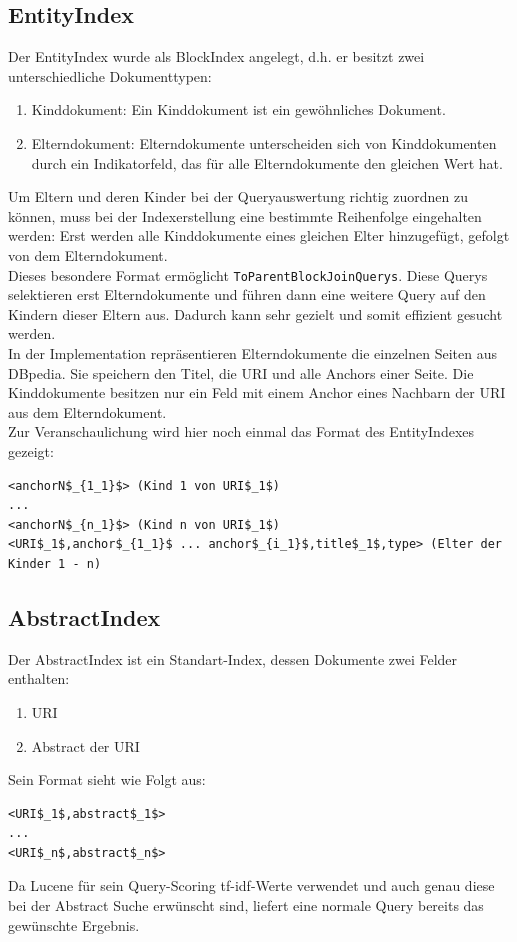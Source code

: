 \documentclass[11pt, a4paper, oneside]{Thesis} %
\begin{document}
\subsection{EntityIndex}
Der EntityIndex wurde als BlockIndex angelegt, d.h. er besitzt zwei unterschiedliche Dokumenttypen:
\begin{enumerate}
\item Kinddokument: Ein Kinddokument ist ein gew\"ohnliches Dokument.
\item Elterndokument: Elterndokumente unterscheiden sich von Kinddokumenten durch ein Indikatorfeld, das f\"ur alle Elterndokumente den gleichen Wert hat.
\end{enumerate}
Um Eltern und deren Kinder bei der Queryauswertung richtig zuordnen zu k\"onnen, muss bei der Indexerstellung eine bestimmte Reihenfolge eingehalten werden: Erst werden alle Kinddokumente eines gleichen Elter hinzugef\"ugt, gefolgt von dem Elterndokument.\\
Dieses besondere Format erm\"oglicht \texttt{ToParentBlockJoinQuerys}. Diese Querys selektieren erst Elterndokumente und f\"uhren dann eine weitere Query auf den Kindern dieser Eltern aus. Dadurch kann sehr gezielt und somit effizient gesucht werden.\\
In der Implementation repr\"asentieren Elterndokumente die einzelnen Seiten aus DBpedia. Sie speichern den Titel, die URI und alle Anchors einer Seite. Die Kinddokumente  besitzen nur ein Feld mit einem Anchor eines Nachbarn der URI aus dem Elterndokument.\\
Zur Veranschaulichung wird hier noch einmal das Format des EntityIndexes gezeigt:
\begin{lstlisting}
<anchorN$_{1_1}$> (Kind 1 von URI$_1$)
...
<anchorN$_{n_1}$> (Kind n von URI$_1$)
<URI$_1$,anchor$_{1_1}$ ... anchor$_{i_1}$,title$_1$,type> (Elter der Kinder 1 - n) 
\end{lstlisting}
\subsection{AbstractIndex}
Der AbstractIndex ist ein Standart-Index, dessen Dokumente zwei Felder enthalten:
\begin{enumerate}
\item URI
\item Abstract der URI
\end{enumerate}
Sein Format sieht wie Folgt aus:
\begin{lstlisting}
<URI$_1$,abstract$_1$>
...
<URI$_n$,abstract$_n$>
\end{lstlisting}
Da Lucene f\"ur sein Query-Scoring tf-idf-Werte verwendet und auch genau diese bei der Abstract Suche erw\"unscht sind, liefert eine normale Query bereits das gew\"unschte Ergebnis.
\end{document}
